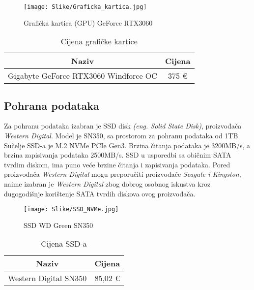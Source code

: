 \documentclass[14pt]{article}
\begin{document}
    \begin{figure}[H]
        \centering
        \texttt{[image: Slike/Graficka\_kartica.jpg]}
        \caption{Grafička kartica (GPU) GeForce RTX3060}
        \label{fig:Graficka}
    \end{figure}

    \begin{table}[H]
        \centering
        \begin{tabular}{|c|c|}
            \hline
            Naziv & Cijena \\
            \hline
            Gigabyte GeForce RTX3060 Windforce OC & 375 € \\
            \hline
        \end{tabular}
        \caption{Cijena grafičke kartice}
        \label{tab:Graficka}
    \end{table}

    \clearpage
    \subsection{Pohrana podataka}
    Za pohranu podataka izabran je SSD disk \emph{(eng. Solid State Disk)}, proizvođača \textit{Western Digital}. Model je SN350, sa prostorom za pohranu podataka od 1TB. Sučelje SSD-a je M.2 NVMe PCIe Gen3. Brzina čitanja podataka je 3200MB/s, a brzina zapisivanja podataka 2500MB/s. SSD u usporedbi sa običnim SATA tvrdim diskom, ima puno veće brzine čitanja i zapisivanja podataka. Pored proizvođača \textit{Western Digital} mogu preporučiti proizvođače \textit{Seagate i Kingston}, naime izabran je \textit{Western Digital} zbog dobrog osobnog iskustva kroz dugogodišnje korištenje SATA tvrdih diskova ovog proizvođača.

    \begin{figure}[H]
        \centering
        \texttt{[image: Slike/SSD\_NVMe.jpg]}
        \caption{SSD WD Green SN350}
        \label{fig:Pohrana}
    \end{figure}

    \begin{table}[H]
        \centering
        \begin{tabular}{|c|c|}
            \hline
            Naziv & Cijena \\
            \hline
            Western Digital SN350 & 85,02 € \\
            \hline
        \end{tabular}
        \caption{Cijena SSD-a}
        \label{tab:Pohrana}
    \end{table}
\end{document}
